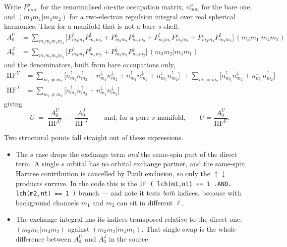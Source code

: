\documentclass[11pt,a4paper]{article}
\newcommand{\C}[1]{\texttt{\small #1}}
\begin{document}
Write $P^\sigma_{m m'}$ for the renormalised on-site occupation matrix,
$n^\sigma_{mm}$ for the bare one, and $(m_3 m_1 | m_4 m_2)$ for a two-electron
repulsion integral over real spherical harmonics. Then for a manifold that is
not a bare $s$ shell:
%
\begin{align}
A_0^U &= \sum_{m_1 m_2 m_3 m_4}
  \Big[P^{\uparrow}_{m_3m_1}P^{\uparrow}_{m_4m_2}
     + P^{\downarrow}_{m_3m_1}P^{\downarrow}_{m_4m_2}
     + P^{\uparrow}_{m_3m_1}P^{\downarrow}_{m_4m_2}
     + P^{\downarrow}_{m_3m_1}P^{\uparrow}_{m_4m_2}\Big]\,(m_3m_1|m_4m_2)
     \label{eq:a0u}\\[2pt]
A_0^J &= \sum_{m_1 m_2 m_3 m_4}
  \Big[P^{\uparrow}_{m_3m_1}P^{\uparrow}_{m_4m_2}
     + P^{\downarrow}_{m_3m_1}P^{\downarrow}_{m_4m_2}\Big]\,(m_3m_2|m_4m_1)
     \label{eq:a0j}
\end{align}
%
and the denominators, built from bare occupations only,
%
\begin{align}
\mathrm{HF}^U &= \sum_{m_1 \neq m_2}\!\big[n^{\uparrow}_{m_1}n^{\uparrow}_{m_2}
  + n^{\downarrow}_{m_1}n^{\downarrow}_{m_2}
  + n^{\uparrow}_{m_1}n^{\downarrow}_{m_2}
  + n^{\downarrow}_{m_1}n^{\uparrow}_{m_2}\big]
  \;+ \sum_{m_1 = m_2}\!\big[n^{\uparrow}_{m_1}n^{\downarrow}_{m_2}
  + n^{\downarrow}_{m_1}n^{\uparrow}_{m_2}\big] \\[2pt]
\mathrm{HF}^J &= \sum_{m_1 \neq m_2}\big[n^{\uparrow}_{m_1}n^{\uparrow}_{m_2}
  + n^{\downarrow}_{m_1}n^{\downarrow}_{m_2}\big]
\end{align}
%
giving
\[
\boxed{\;U \;=\; \frac{A_0^U}{\mathrm{HF}^U} \;-\; \frac{A_0^J}{\mathrm{HF}^J}\;}
\qquad\text{and, for a pure $s$ manifold,}\qquad U = \frac{A_0^U}{\mathrm{HF}^U}.
\]

\noindent
Two structural points fall straight out of these expressions.

\begin{itemize}[leftmargin=1.3em,itemsep=3pt,topsep=4pt]
\item The $s$ case drops the exchange term \emph{and} the same-spin part of the
      direct term. A single $s$ orbital has no orbital exchange partner, and the
      same-spin Hartree contribution is cancelled by Pauli exclusion, so only
      the $\uparrow\downarrow$ products survive. In the code this is the
      \C{IF ( lch(m1,nt) == 1 .AND. lch(m2,nt) == 1 )} branch --- and note it
      tests \emph{both} indices, because with background channels $m_1$ and
      $m_2$ can sit in different $\ell$.
\item The exchange integral has its indices transposed relative to the direct
      one: $(m_3m_1|m_4m_2)$ against $(m_3m_2|m_4m_1)$. That single swap is the
      whole difference between $A_0^U$ and $A_0^J$ in the source.
\end{itemize}
\end{document}

